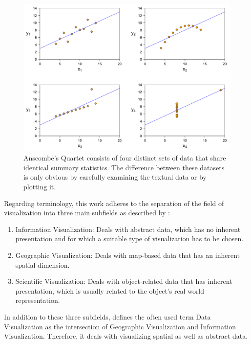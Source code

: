 \begin{figure}[tp]
    \centering
    \includegraphics[keepaspectratio,width=\linewidth,height=\fullh / 2]
    {images/anscombes-quartet.png}

    \caption[Anscombe's Quartet]{
        Anscombe's Quartet consists of four distinct sets of data that share identical summary statistics. The difference between these datasets is only obvious by carefully examining the textual data or by plotting it. 
    }
    \label{fig:AnscombesQuartet}
\end{figure}

Regarding terminology, this work adheres to the separation of the field of visualization into three main subfields as described by \cite{IVISCourseNotes}: 

\begin{enumerate}
    \item Information Visualization: Deals with abstract data, which has no inherent presentation and for which a suitable type of visualization has to be chosen.
    \item Geographic Visualization: Deals with map-based data that has an inherent spatial dimension. 
    \item Scientific Visualization: Deals with object-related data that has inherent presentation, which is usually related to the object's real world representation.
\end{enumerate}

In addition to these three subfields, \cite{IVISCourseNotes} defines the often used term Data Visualization as the intersection of Geographic Visualization and Information Visualization. Therefore, it deals with visualizing spatial as well as abstract data.

